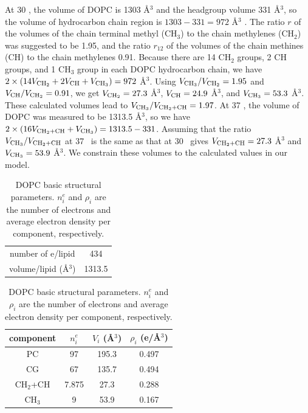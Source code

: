 At 30 \textcelsius, the volume of DOPC is 1303 \AA$^3$ and the headgroup
volume 331 \AA$^3$, so the volume of hydrocarbon chain region is 
$1303 - 331 = 972$ \AA$^3$ \cite{ref:Braun13}. The ratio $r$ of the volumes
of the chain terminal methyl (CH$_3$) to the chain methylenes (CH$_2$) was 
suggested to be 1.95, and the ratio $r_{12}$ of the volumes of the chain
methines (CH) to the chain methylenes 0.91. Because there are 14 CH$_2$ groups,
2 CH groups, and 1 CH$_3$ group in each DOPC hydrocarbon chain, we have
$2\times(14V_{\textrm{CH}_2}+2V_\textrm{CH}+V_{\textrm{CH}_3})=972$ \AA$^3$. 
Using $V_{\textrm{CH}_3}/V_{\textrm{CH}_2}=1.95$ 
and $V_\textrm{CH}/V_{\textrm{CH}_2}=0.91$, we get $V_{\textrm{CH}_2}=27.3$ \AA$^3$, 
$V_\textrm{CH}=24.9$ \AA$^3$, and $V_{\textrm{CH}_3}=53.3$ \AA$^3$. These calculated volumes
lead to $V_{\textrm{CH}_3}/V_{\textrm{CH}_2+\textrm{CH}}=1.97$. 
At 37 \textcelsius, the volume of DOPC was measured to be 1313.5 \AA$^3$, so
we have $2\times(16V_{\textrm{CH}_2+\textrm{CH}}+V_{\textrm{CH}_3})=1313.5-331$. Assuming that the ratio 
$V_{\textrm{CH}_3}/V_{\textrm{CH}_2+\textrm{CH}}$ at 37 \textcelsius\ is the same as that at 30 \textcelsius\ 
gives $V_{\textrm{CH}_2+\textrm{CH}}=27.3$ \AA$^3$ and $V_{\textrm{CH}_3}=53.9$ \AA$^3$. We constrain
these volumes to the calculated values in our model.
\begin{table}[htbp]
  \centering
  \begin{tabular}{ cc }
  \hline
    number of e/lipid & 434 \\ 
    volume/lipid (\AA$^3$) & 1313.5 \\
  \hline
  \end{tabular}
  \quad
  \begin{tabular}{ cccc }
    \hline
    component & $n^e_i$ & $V_i$ (\AA$^3$) & $\rho_i$ (e/\AA$^3$) \\
    \hline 
    PC & 97 & 195.3 & 0.497 \\  
    CG & 67 & 135.7 & 0.494 \\  
    CH$_2$+CH & 7.875 & 27.3 & 0.288 \\
    CH$_3$ & 9 & 53.9 & 0.167 \\
    \hline
  \end{tabular}
  \caption{DOPC basic structural parameters. $n^e_i$ and $\rho_i$ are
  the number of electrons and average electron density per component, 
  respectively.}
  \label{tb:DOPC_basic_params}
\end{table}
